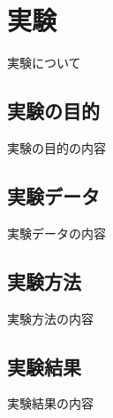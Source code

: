 \chapter{実験}\label{chap4}
実験について

\section{実験の目的}\label{4-1}
実験の目的の内容

\section{実験データ}\label{4-2}
実験データの内容

\section{実験方法}\label{4-3}
実験方法の内容

\section{実験結果}\label{4-4}
実験結果の内容